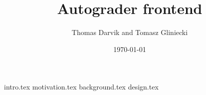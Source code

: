 \documentclass[10pt,a4paper]{report}
\title{Autograder frontend}
\author{Thomas Darvik and Tomasz Gliniecki}
\date{\today}
\begin{document}

\maketitle
{intro.tex}
{motivation.tex}
{background.tex}
{design.tex}
\end{document}
